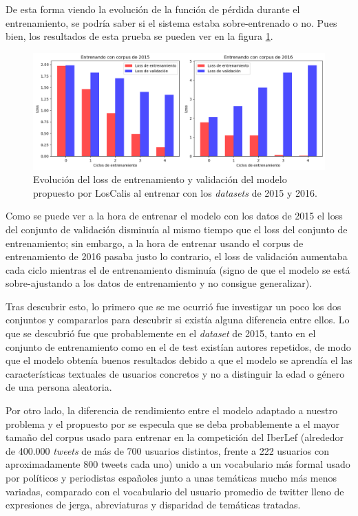 De esta forma viendo la evolución de la función de pérdida durante el entrenamiento, se podría saber si el sistema estaba sobre-entrenado o no. Pues bien, los resultados de esta prueba se pueden ver en la figura \ref{fig:loss}.
\\
 \begin{figure}[hbtp!]
    \centering
    \includegraphics[width=\textwidth]{imaxes/loss.png}
    \caption{Evolución del loss de entrenamiento y validación del modelo propuesto por LosCalis al entrenar con los \textit{datasets} de 2015 y 2016.}
    \label{fig:loss}
\end{figure}
Como se puede ver a la hora de entrenar el modelo con los datos de 2015 el loss del conjunto de validación disminuía al mismo tiempo que el loss del conjunto de entrenamiento; sin embargo, a la hora de entrenar usando el corpus de entrenamiento de 2016 pasaba justo lo contrario, el loss de validación aumentaba cada ciclo mientras el de entrenamiento disminuía (signo de que el modelo se está sobre-ajustando a los datos de entrenamiento y no consigue generalizar).

 Tras descubrir esto, lo primero que se me ocurrió fue investigar un poco los dos conjuntos y compararlos para descubrir si existía alguna diferencia entre ellos. Lo que se descubrió fue que probablemente en el \textit{dataset} de 2015, tanto en el conjunto de entrenamiento como en el de test existían autores repetidos, de modo que el modelo obtenía buenos resultados debido a que el modelo se aprendía el las características textuales de usuarios concretos y no a distinguir la edad o género de una persona aleatoria.
 
 Por otro lado, la diferencia de rendimiento entre el modelo adaptado a nuestro problema y el propuesto por \cite{loscalis22} se especula que se deba probablemente a el mayor tamaño del corpus usado para entrenar en la competición del IberLef (alrededor de 400.000 \textit{tweets} de más de 700 usuarios distintos, frente a 222 usuarios con aproximadamente 800 tweets cada uno) unido a un vocabulario más formal usado por políticos y periodistas españoles junto a unas temáticas mucho más menos variadas, comparado con el vocabulario del usuario promedio de twitter lleno de expresiones de jerga, abreviaturas y disparidad de temáticas tratadas.
 
